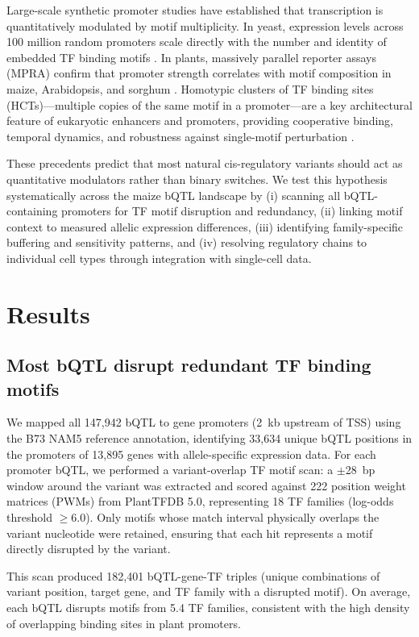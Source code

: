 \documentclass[11pt,a4paper]{article}
\begin{document}
Large-scale synthetic promoter studies have established that transcription is quantitatively modulated by motif multiplicity. In yeast, expression levels across 100 million random promoters scale directly with the number and identity of embedded TF binding motifs \citep{deboer2020}. In plants, massively parallel reporter assays (MPRA) confirm that promoter strength correlates with motif composition in maize, Arabidopsis, and sorghum \citep{jores2021}. Homotypic clusters of TF binding sites (HCTs)---multiple copies of the same motif in a promoter---are a key architectural feature of eukaryotic enhancers and promoters, providing cooperative binding, temporal dynamics, and robustness against single-motif perturbation \citep{gotea2010}.

These precedents predict that most natural cis-regulatory variants should act as quantitative modulators rather than binary switches. We test this hypothesis systematically across the maize bQTL landscape by (i) scanning all bQTL-containing promoters for TF motif disruption and redundancy, (ii) linking motif context to measured allelic expression differences, (iii) identifying family-specific buffering and sensitivity patterns, and (iv) resolving regulatory chains to individual cell types through integration with single-cell data.

\section{Results}

\subsection{Most bQTL disrupt redundant TF binding motifs}

We mapped all 147,942 bQTL to gene promoters (2~kb upstream of TSS) using the B73 NAM5 reference annotation, identifying 33,634 unique bQTL positions in the promoters of 13,895 genes with allele-specific expression data. For each promoter bQTL, we performed a variant-overlap TF motif scan: a $\pm$28~bp window around the variant was extracted and scored against 222 position weight matrices (PWMs) from PlantTFDB 5.0, representing 18 TF families (log-odds threshold $\geq 6.0$). Only motifs whose match interval physically overlaps the variant nucleotide were retained, ensuring that each hit represents a motif directly disrupted by the variant.

This scan produced 182,401 bQTL-gene-TF triples (unique combinations of variant position, target gene, and TF family with a disrupted motif). On average, each bQTL disrupts motifs from 5.4 TF families, consistent with the high density of overlapping binding sites in plant promoters.
\end{document}
